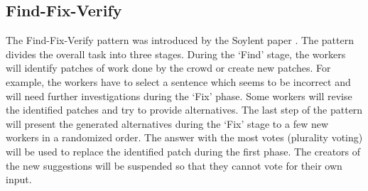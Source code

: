 \subsection{Find-Fix-Verify}
The Find-Fix-Verify pattern was introduced by the Soylent paper \cite{soylent}. The pattern divides the overall task into three stages. During the `Find' stage, the workers will identify patches of work done by the crowd or create new patches. For example, the workers have to select a sentence which seems to be incorrect and will need further investigations during the `Fix' phase. Some workers will revise the identified patches and try to provide alternatives. The last step of the pattern will present the generated alternatives during the `Fix' stage to a few new workers in a randomized order. The answer with the most votes (plurality voting) will be used to replace the identified patch during the first phase. The creators of the new suggestions will be suspended so that they cannot vote for their own input.

